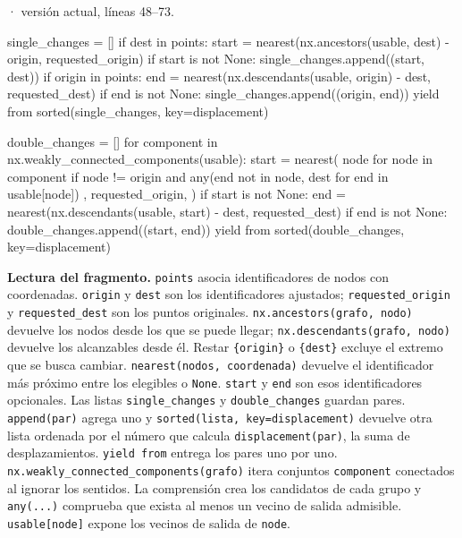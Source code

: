 \documentclass[11pt,a4paper]{article}
\begin{document}
\smallskip
{\footnotesize\texttt{} · versión actual, líneas 48--73.}\par
\begin{Codigo}[firstnumber=48]
    single_changes = []
    if dest in points:
        start = nearest(nx.ancestors(usable, dest) - {origin}, requested_origin)
        if start is not None:
            single_changes.append((start, dest))
    if origin in points:
        end = nearest(nx.descendants(usable, origin) - {dest}, requested_dest)
        if end is not None:
            single_changes.append((origin, end))
    yield from sorted(single_changes, key=displacement)

    double_changes = []
    for component in nx.weakly_connected_components(usable):
        start = nearest(
            {
                node
                for node in component
                if node != origin and any(end not in {node, dest} for end in usable[node])
            },
            requested_origin,
        )
        if start is not None:
            end = nearest(nx.descendants(usable, start) - {dest}, requested_dest)
            if end is not None:
                double_changes.append((start, end))
    yield from sorted(double_changes, key=displacement)
\end{Codigo}

\textbf{Lectura del fragmento.} \texttt{points} asocia identificadores de nodos con coordenadas. \texttt{origin} y \texttt{dest} son los identificadores ajustados; \texttt{requested\_origin} y \texttt{requested\_dest} son los puntos originales. \texttt{nx.ancestors(grafo, nodo)} devuelve los nodos desde los que se puede llegar; \texttt{nx.descendants(grafo, nodo)} devuelve los alcanzables desde él. Restar \texttt{\{origin\}} o \texttt{\{dest\}} excluye el extremo que se busca cambiar. \texttt{nearest(nodos, coordenada)} devuelve el identificador más próximo entre los elegibles o \texttt{None}. \texttt{start} y \texttt{end} son esos identificadores opcionales. Las listas \texttt{single\_changes} y \texttt{double\_changes} guardan pares. \texttt{append(par)} agrega uno y \texttt{sorted(lista, key=displacement)} devuelve otra lista ordenada por el número que calcula \texttt{displacement(par)}, la suma de desplazamientos. \texttt{yield from} entrega los pares uno por uno. \texttt{nx.weakly\_connected\_components(grafo)} itera conjuntos \texttt{component} conectados al ignorar los sentidos. La comprensión crea los candidatos de cada grupo y \texttt{any(...)} comprueba que exista al menos un vecino de salida admisible. \texttt{usable[node]} expone los vecinos de salida de \texttt{node}.
\end{document}
